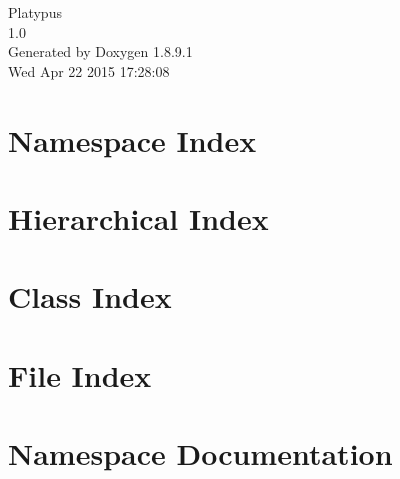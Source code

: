 \documentclass[twoside]{book}
\newcommand{\+}{\discretionary{\mbox{\scriptsize$\hookleftarrow$}}{}{}}
\newcommand{\clearemptydoublepage}{%
  \newpage{\pagestyle{empty}\cleardoublepage}%
}
\begin{document}
\hypersetup{pageanchor=false,
             bookmarks=true,
             bookmarksnumbered=true,
             pdfencoding=unicode
            }
\begin{titlepage}
\vspace*{7cm}
\begin{center}%
{\Large Platypus \\[1ex]\large 1.\+0 }\\
\vspace*{1cm}
{\large Generated by Doxygen 1.8.9.1}\\
\vspace*{0.5cm}
{\small Wed Apr 22 2015 17:28:08}\\
\end{center}
\end{titlepage}
\clearemptydoublepage
\tableofcontents
\clearemptydoublepage
{}
\hypersetup{pageanchor=true}

\chapter{Namespace Index}

\chapter{Hierarchical Index}

\chapter{Class Index}

\chapter{File Index}

\chapter{Namespace Documentation}

























\end{document}
